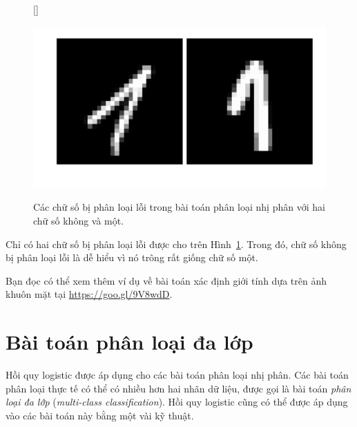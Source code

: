 \begin{figure}[t]
   
    [\FBwidth]
    {\caption{ 
    Các chữ số bị phân loại lỗi trong bài toán phân loại nhị phân với hai chữ số không và một. 
    }
    \label{fig:10_mnist_miss}}
    { %
    \includegraphics[width=.4\textwidth]{ebookML_src/src/logistic_regression/mnist_mis.pdf}
    }
\end{figure}
Chỉ có hai chữ số bị phân loại lỗi được cho trên Hình~\ref{fig:10_mnist_miss}.
Trong đó, chữ số không bị phân loại lỗi là dễ hiểu vì nó trông rất giống chữ số một. 

 

Bạn đọc có thể xem thêm ví dụ về bài toán xác định giới tính dựa trên ảnh
khuôn mặt tại \url{https://goo.gl/9V8wdD}.

\section{Bài toán phân loại đa lớp}
\label{sec:biclassifier}
Hồi quy logistic được áp dụng cho các bài toán phân loại nhị phân. Các bài
toán phân loại thực tế có thể có nhiều hơn hai nhãn dữ liệu, được gọi
là bài toán \textit{phân loại đa lớp} (\textit{multi-class classification}). Hồi quy logistic cũng có thể được áp dụng vào các bài toán này bằng một vài kỹ thuật. 

